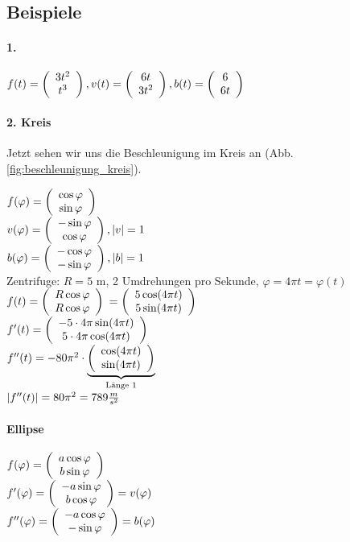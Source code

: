 \subsection{Beispiele}
\paragraph{1.} 
$ f(t)= \vektor{ 3t^2\\t^3}, v(t)=\vektor{ 6t\\3t^2 }, b(t)=\vektor{ 6\\ 6t}$
\paragraph{2. Kreis} 
Jetzt sehen wir uns die Beschleunigung im Kreis an (Abb. \ref{fig:beschleunigung_kreis}).

$f(\varphi) = \vektor{ \cos \varphi\\ \sin \varphi }$\\
$v(\varphi) = \vektor{ -\sin \varphi\\ \cos \varphi }, \abs{v}=1 $\\
$b(\varphi)= \vektor{ -\cos \varphi\\ -\sin \varphi }, \abs{b}=1$\\
Zentrifuge: $R=5$ m, 2 Umdrehungen pro Sekunde, $\varphi=4\pi t = \varphi(t)$\\
$f(t)=\vektor{ R\cos \varphi\\ R\cos \varphi } $
$= \vektor{ 5 \cos(4\pi t)\\ 5 \sin(4\pi t)}$\\
$f'(t) = \vektor{ -5\cdot 4\pi \sin(4\pi t)\\ 5\cdot 4 \pi \cos(4\pi t) }$\\
$f''(t) = -80\pi^2 \cdot \underbrace{\vektor{ \cos(4\pi t)\\ \sin(4\pi t) }}_{\textrm{Länge 1}}$\\
$\abs{f''(t)}=80\pi^2 = 789 \frac{m}{s^2}$
\paragraph{Ellipse}
$ f(\varphi)=\vektor{ a \cos \varphi \\ b \sin \varphi }$\\
$ f'(\varphi)= \vektor{ -a \sin \varphi\\ b \cos \varphi}=v(\varphi)$\\
$ f''(\varphi)= \vektor{ -a \cos \varphi\\ - \sin \varphi}=b(\varphi)$

